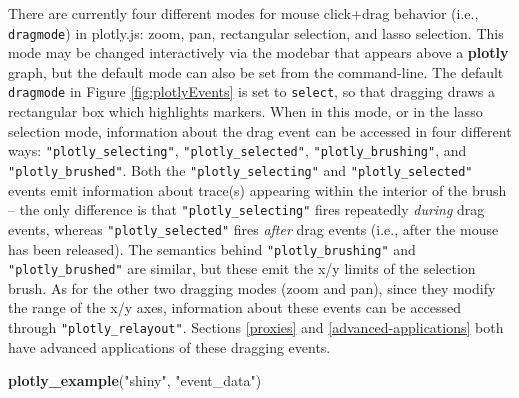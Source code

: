 \documentclass[
  12pt,
]{krantz}
\newenvironment{Shaded}{\begin{snugshade}}{\end{snugshade}}
\newcommand{\KeywordTok}[1]{\textcolor[rgb]{0.13,0.29,0.53}{\textbf{#1}}}
\newcommand{\NormalTok}[1]{#1}
\newcommand{\StringTok}[1]{\textcolor[rgb]{0.31,0.60,0.02}{#1}}
\begin{document}
There are currently four different modes for mouse click+drag behavior (i.e., \texttt{dragmode}) in plotly.js: zoom, pan, rectangular selection, and lasso selection. This mode may be changed interactively via the modebar that appears above a \textbf{plotly} graph, but the default mode can also be set from the command-line. The default \texttt{dragmode} in Figure \ref{fig:plotlyEvents} is set to \texttt{\textquotesingle{}select\textquotesingle{}}, so that dragging draws a rectangular box which highlights markers. When in this mode, or in the lasso selection mode, information about the drag event can be accessed in four different ways: \texttt{"plotly\_selecting"}, \texttt{"plotly\_selected"}, \texttt{"plotly\_brushing"}, and \texttt{"plotly\_brushed"}. Both the \texttt{"plotly\_selecting"} and \texttt{"plotly\_selected"} events emit information about trace(s) appearing within the interior of the brush -- the only difference is that \texttt{"plotly\_selecting"} fires repeatedly \emph{during} drag events, whereas \texttt{"plotly\_selected"} fires \emph{after} drag events (i.e., after the mouse has been released). The semantics behind \texttt{"plotly\_brushing"} and \texttt{"plotly\_brushed"} are similar, but these emit the x/y limits of the selection brush. As for the other two dragging modes (zoom and pan), since they modify the range of the x/y axes, information about these events can be accessed through \texttt{"plotly\_relayout"}. Sections \ref{proxies} and \ref{advanced-applications} both have advanced applications of these dragging events.

\begin{Shaded}
\begin{Highlighting}[]
\KeywordTok{plotly_example}\NormalTok{(}\StringTok{"shiny"}\NormalTok{, }\StringTok{"event_data"}\NormalTok{)}
\end{Highlighting}
\end{Shaded}
\end{document}
